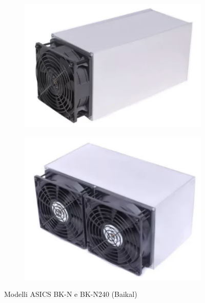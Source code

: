 \begin{figure}[h!]
    \centering
    \begin{subfigure}[b]{0.15\linewidth}
        \includegraphics[width=\linewidth]{images/Baikal BK-N.png}
        \caption{}
        \label{fig:Baikal BK-N}
    \end{subfigure}
    \hspace{1.5cm}
    \begin{subfigure}[b]{0.15\linewidth}
        \includegraphics[width=\linewidth]{images/Baikal N240.png}
        \caption{}
        \label{fig:Baikal N240}
    \end{subfigure}
    \caption{Modelli ASICS BK-N e BK-N240 (Baikal)}
    \label{fig:Baikal miners}
\end{figure}


